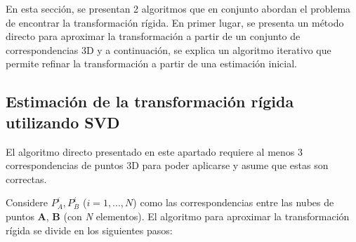 En esta sección, se presentan 2 algoritmos que en conjunto abordan el problema de encontrar la transformación rígida. En primer lugar, se presenta un método directo para aproximar la transformación a partir de un conjunto de correspondencias 3D y a continuación, se explica un algoritmo iterativo que permite refinar la transformación a partir de una estimación inicial.

\subsection{Estimación de la transformación rígida utilizando SVD}
El algoritmo directo presentado en este apartado requiere al menos 3 correspondencias de puntos 3D para poder aplicarse y asume que estas son correctas.

Considere $P_{A}^{i}, P_{B}^{i}$ ($i=1,...,N$) como las correspondencias entre las nubes de puntos \textbf{A}, \textbf{B} (con \textsl{N} elementos).
El algoritmo para aproximar la transformación rígida se divide en los siguientes pasos:
